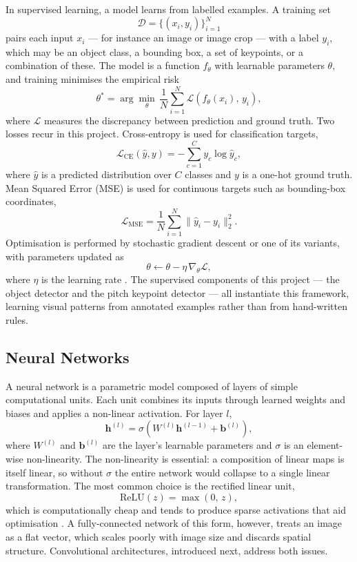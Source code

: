 In supervised learning, a model learns from labelled examples. 
A training set
\[
    \mathcal{D} = \{(x_i, y_i)\}_{i=1}^{N}
\]
pairs each input \(x_i\) — for instance an image or image 
crop — with a label \(y_i\), which may be an object class, 
a bounding box, a set of keypoints, or a combination of 
these. The model is a function \(f_{\theta}\) with learnable 
parameters \(\theta\), and training minimises the empirical 
risk
\[
    \theta^{*} = \arg\min_{\theta}\, \frac{1}{N}
    \sum_{i=1}^{N} \mathcal{L}\!\left(f_{\theta}(x_i),\, y_i\right),
\]
where \(\mathcal{L}\) measures the discrepancy between 
prediction and ground truth. Two losses recur in this 
project. Cross-entropy is used for classification targets,
\[
    \mathcal{L}_{\text{CE}}(\hat{y}, y) =
    -\sum_{c=1}^{C} y_c \log \hat{y}_c,
\]
where \(\hat{y}\) is a predicted distribution over \(C\) 
classes and \(y\) is a one-hot ground truth. Mean Squared 
Error (MSE) is used for continuous targets such as 
bounding-box coordinates,
\[
    \mathcal{L}_{\text{MSE}} =
    \frac{1}{N}\sum_{i=1}^{N}
    \lVert \hat{y}_i - y_i \rVert_2^{2}.
\]
Optimisation is performed by stochastic gradient descent 
or one of its variants, with parameters updated as
\[
    \theta \leftarrow \theta - \eta\, \nabla_{\theta} \mathcal{L},
\]
where \(\eta\) is the learning rate \cite{Goodfellow2016}. 
The supervised components of this project — the object 
detector and the pitch keypoint detector — all instantiate 
this framework, learning visual patterns from annotated 
examples rather than from hand-written rules.

\subsection{Neural Networks}
\label{sec:neural-networks}

A neural network is a parametric model composed of layers 
of simple computational units. Each unit combines its 
inputs through learned weights and biases and applies a 
non-linear activation. For layer \(l\),
\[
    \mathbf{h}^{(l)} =
    \sigma\!\left(W^{(l)} \mathbf{h}^{(l-1)} + \mathbf{b}^{(l)}\right),
\]
where \(W^{(l)}\) and \(\mathbf{b}^{(l)}\) are the layer's 
learnable parameters and \(\sigma\) is an element-wise 
non-linearity. The non-linearity is essential: a 
composition of linear maps is itself linear, so without 
\(\sigma\) the entire network would collapse to a single 
linear transformation. The most common choice is the 
rectified linear unit,
\[
    \mathrm{ReLU}(z) = \max(0,\, z),
\]
which is computationally cheap and tends to produce sparse 
activations that aid optimisation \cite{Goodfellow2016}. A 
fully-connected network of this form, however, treats an 
image as a flat vector, which scales poorly with image 
size and discards spatial structure. Convolutional 
architectures, introduced next, address both issues.

